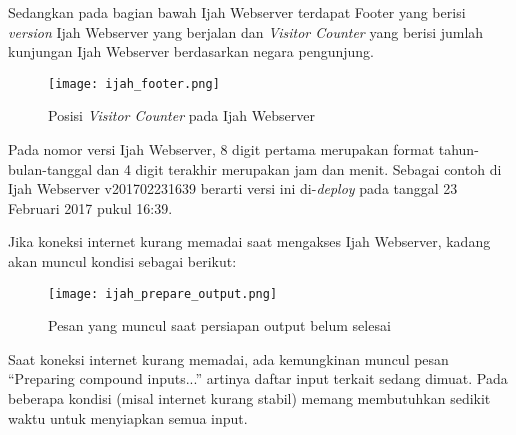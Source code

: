 Sedangkan pada bagian bawah Ijah Webserver terdapat Footer yang berisi \emph{version} Ijah Webserver yang berjalan dan \emph{Visitor Counter} yang berisi jumlah kunjungan Ijah Webserver berdasarkan negara pengunjung.

\begin{figure}[!h]
	\centering
	\texttt{[image: ijah\_footer.png]}
	\caption{Posisi \emph{Visitor Counter} pada Ijah Webserver}
	\label{fig:ijah_footer}
\end{figure}

Pada nomor versi Ijah Webserver, 8 digit pertama merupakan format tahun-bulan-tanggal dan 4 digit terakhir merupakan jam dan menit. Sebagai contoh di Ijah Webserver v201702231639 berarti versi ini di-\emph{deploy} pada tanggal 23 Februari 2017 pukul 16:39.



Jika koneksi internet kurang memadai saat mengakses Ijah Webserver, kadang akan muncul kondisi sebagai berikut:

\begin{figure}[!h]
	\centering
	\texttt{[image: ijah\_prepare\_output.png]}
	\caption{Pesan yang muncul saat persiapan output belum selesai}
	\label{fig:ijah_prepare_output}
\end{figure}

Saat koneksi internet kurang memadai, ada kemungkinan muncul pesan ``Preparing compound inputs...'' artinya daftar input terkait sedang dimuat. Pada beberapa kondisi (misal internet kurang stabil) memang membutuhkan sedikit waktu untuk menyiapkan semua input.


